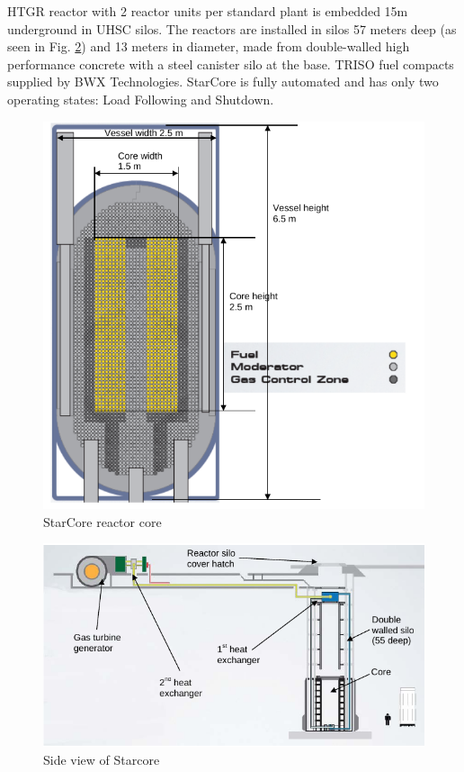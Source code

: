 \documentclass[10pt,a4paper]{article}
\begin{document}
HTGR reactor with 2 reactor units per standard plant is embedded 15m underground in \gls{UHSC} silos. The reactors are installed in silos 57 meters deep (as seen in Fig. \ref{Starview}) and 13 meters in diameter, made from double-walled high performance concrete with a steel canister silo at the base.  TRISO fuel compacts supplied by BWX Technologies. StarCore is fully automated and has only two operating states: Load Following and Shutdown.

\begin{figure}[htbp]
\centering
\includegraphics[scale=0.5]{Figs/starcorereactor.jpeg}
\caption{StarCore reactor core}
\label{Starcore}
\end{figure}

\begin{figure}[htbp]
\centering
\includegraphics[scale=0.7]{Figs/starcoreview.jpeg}
\caption{Side view of Starcore}
\label{Starview}
\end{figure}
\end{document}
